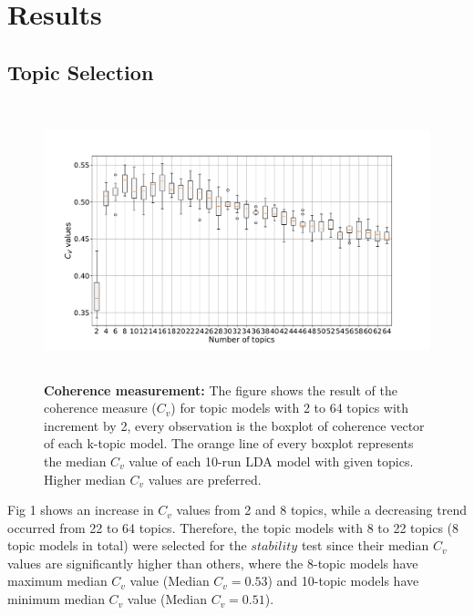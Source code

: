 \section{Results}

\subsection{Topic Selection}

\begin{figure}[H]
    \centering
    \includegraphics[width = 16cm, height = 8cm]{./img/topic_selection.pdf}
    \caption[The result of the coherence measurement]{\textbf{Coherence measurement:} The figure shows the result of the coherence measure ($C_v$) for topic models with 2 to 64 topics with increment by 2, every observation is the boxplot of coherence vector of each k-topic model. The orange line of every boxplot represents the median $C_v$ value of each 10-run LDA model with given topics. Higher median $C_v$ values are preferred.}
\end{figure}

Fig 1 shows an increase in $C_v$ values from 2 and 8 topics, while a decreasing trend occurred from 22 to 64 topics. Therefore, the topic models with 8 to 22 topics (8 topic models in total) were selected for the $stability$ test since their median $C_v$ values are significantly higher than others, where the 8-topic models have maximum median $C_v$ value (Median $C_v = 0.53$) and 10-topic models have minimum median $C_v$ value (Median $C_v = 0.51$).

